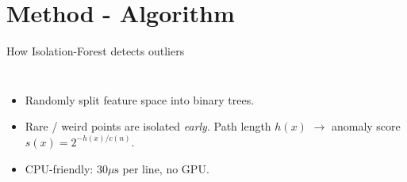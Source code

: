 \documentclass[14pt,aspectratio=169,draft]{beamer}
\begin{document}
\section{Method - Algorithm }
\begin{frame}{How Isolation-Forest detects outliers}
\begin{columns}
\begin{itemize}[<+->]
  \item Randomly split feature space into binary trees.
  \item Rare / weird points are isolated \emph{early}.  
        Path length \(h(x)\) $\rightarrow$ anomaly score  
        \(s(x)=2^{-h(x)/c(n)}\).
  \item CPU-friendly: \(30 \mu\text{s}\) per line, no GPU.
\end{itemize}

\centering
\begin{adjustbox}{max width=\linewidth}
\end{adjustbox}
\end{columns}
\end{frame}
\end{document}
